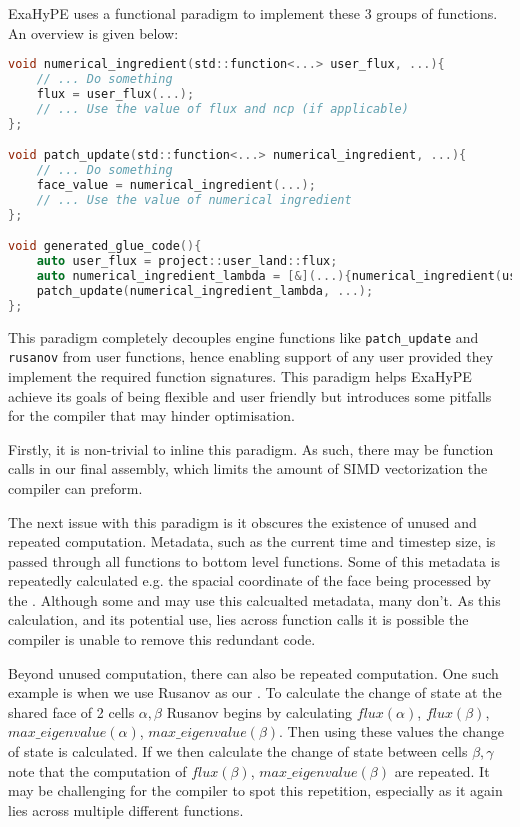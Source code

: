 ExaHyPE uses a functional paradigm to implement these 3 groups of functions.
An overview is given below:
\begin{lstlisting}[language=c]
void numerical_ingredient(std::function<...> user_flux, ...){
    // ... Do something
    flux = user_flux(...);
    // ... Use the value of flux and ncp (if applicable) 
};

void patch_update(std::function<...> numerical_ingredient, ...){
    // ... Do something
    face_value = numerical_ingredient(...);
    // ... Use the value of numerical ingredient
};

void generated_glue_code(){
    auto user_flux = project::user_land::flux;
    auto numerical_ingredient_lambda = [&](...){numerical_ingredient(user_flux, ...)};
    patch_update(numerical_ingredient_lambda, ...);
};
\end{lstlisting}
This paradigm completely decouples engine functions like \lstinline{patch_update} and \lstinline{rusanov} from user functions, hence enabling support of any user  provided they implement the required function signatures.
This paradigm helps ExaHyPE achieve its goals of being flexible and user friendly but introduces some pitfalls for the compiler that may hinder optimisation.

Firstly, it is non-trivial to inline this paradigm.
As such, there may be function calls in our final assembly, which limits the amount of SIMD vectorization the compiler can preform.

The next issue with this paradigm is it obscures the existence of unused and repeated computation.
Metadata, such as the current time and timestep size, is passed through all functions to bottom level  functions.
Some of this metadata is repeatedly calculated e.g. the spacial coordinate of the face being processed by the .
Although some  and  may use this calcualted metadata, many don't.
As this calculation, and its potential use, lies across function calls it is possible the compiler is unable to remove this redundant code.

Beyond unused computation, there can also be repeated computation.
One such example is when we use Rusanov as our .
To calculate the change of state at the shared face of 2 cells $\alpha,\beta$ Rusanov begins by calculating $flux(\alpha)$, $flux(\beta)$, $max\_eigenvalue(\alpha)$, $max\_eigenvalue(\beta)$.
Then using these values the change of state is calculated.
If we then calculate the change of state between cells $\beta,\gamma$ note that the computation of $flux(\beta)$, $max\_eigenvalue(\beta)$ are repeated.
It may be challenging for the compiler to spot this repetition, especially as it again lies across multiple different functions.


